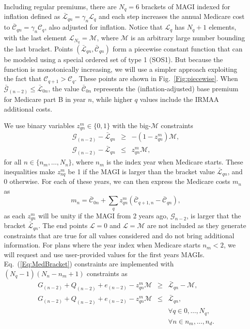 \documentclass{report}[fleqn,11pt]
\begin{document}
	Including regular premiums, there are $N_q=6$ brackets
	of MAGI indexed for inflation defined as
	$\bar{\mathcal{L}}_{qn} = \gamma_n\mathcal{L}_q$ and each step increases
	the annual Medicare
	cost to $\bar{\mathcal{C}}_{qn} = \gamma_n\mathcal{C}_q$, also adjusted for inflation.
	Notice that $\mathcal{L}_q$ has $N_q + 1$ elements, with the last element
	$\mathcal{L}_{N_q} = \mathcal{M}$, where $\mathcal{M}$ is an arbitrary large number
	bounding the last bracket.
        Points $(\bar{\mathcal{L}}_{qn}, \bar{\mathcal{C}}_{qn})$ form a piecewise
	constant function that can be modeled using a special ordered set of type 1 (SOS1).
        But because the function is monotonically increasing, we will use a simpler approach
        exploiting the fact that $\mathcal{C}_{q+1} > \mathcal{C}_q$.
	These points are shown in Fig.~\ref{Fig:piecewise}.
        When $\bar{\mathcal{G}}_{(n-2)} \leq \bar{\mathcal{L}}_{0n}$,
	the value $\bar{\mathcal{C}}_{0n}$
	represents the (inflation-adjusted) base premium for Medicare part B in year $n$, while
	higher $q$ values include the IRMAA additional costs.

	We use binary variables $z_{qn}^m \in \{0, 1\}$ with the big-$\mathcal{M}$ constraints
	\begin{eqnarray}
		\label{Eq:MedBracket}
                \mathcal{G}_{(n-2)} - \bar{\mathcal{L}}_{qn} & \geq & -(1 - z_{qn}^m) \mathcal{M}, \nonumber\\
                \mathcal{G}_{(n-2)} - \bar{\mathcal{L}}_{qn} & \leq & z_{qn}^m \mathcal{M},
	\end{eqnarray}
	for all $n \in \{n_m, \ldots, N_n\}$, where $n_m$ is the index year when
	Medicare starts.
        These inequalities make $z_{nq}^m$ be 1 if
        the MAGI is larger than the bracket value $\bar{\mathcal{L}}_{qn}$, and 0 otherwise.
        For each of these years, we can then express the Medicare costs $m_n$ as
	\begin{equation}
		m_n = \bar{\mathcal{C}}_{0n} + \sum_q z_{qn}^m (\bar{\mathcal{C}}_{q+1,n} - \bar{\mathcal{C}}_{qn}),
	\end{equation}
	as each $z_{qn}^m$ will be unity if the MAGI from 2 years ago, $\mathcal{G}_{n-2}$,
        is larger that the bracket $\bar{\mathcal{L}}_{qn}$.
	The end points $\mathcal{L} = 0$ and $\mathcal{L} = \mathcal{M}$ are not included
        as they generate constraints
	that are true for all values considered and do not bring additional information.
	For plans where the year index when Medicare starts $n_m<2$, we will request
	and use user-provided values for the first years MAGIs.
	Eq.~(\ref{Eq:MedBracket}) constraints are implemented
	with $(N_q -1)(N_n - n_m + 1)$ constraints as
	\begin{eqnarray}
		\label{Eq:MedBracket2}
		G_{(n-2)} + Q_{(n-2)} + e_{(n-2)} - z_{qn}^m \mathcal{M}
                & \geq & \bar{\mathcal{L}}_{qn} - \mathcal{M}, \nonumber\\
		G_{(n-2)} + Q_{(n-2)} + e_{(n-2)} - z_{qn}^m \mathcal{M}
                & \leq & \bar{\mathcal{L}}_{qn}, \nonumber\\
		&&\forall q \in {0, \ldots, N_q},\nonumber \\
		&&\forall n \in {n_m, \ldots, n_d}.
	\end{eqnarray}
\end{document}
